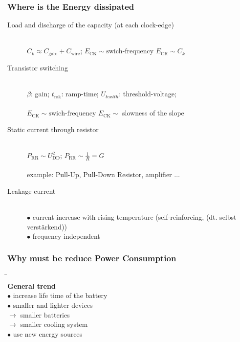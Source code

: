 \subsubsection{Where is the Energy dissipated}
\begin{description}
	\item[Load and discharge of the capacity (at each clock-edge)] \hfill \\
		   \quad $C_k \approx C_{\text{gate}} + C_{\text{wire}}$; \quad $E_{\text{CK}} \sim \text{swich-frequency}$ \quad $E_{\text{CR}} \sim C_k$
		
	\item[Transistor switching ] \hfill \\
		   \quad $\beta$: gain; \quad $t_{\text{rak}}$: ramp-time;  \quad $U_{text{th}}$: threshold-voltage; \\\\ \quad $E_{\text{CK}} \sim \text{swich-frequency}$ \quad $E_{\text{CK}} \sim$ slowness of the slope

	\item[Static current through resistor] \hfill \\
		   \quad $P_{\text{RR}} \sim U_{\text{DD}}^2$; \quad $P_{\text{RR}} \sim \frac{1}{R} = G$\\\\
		example: Pull-Up, Pull-Down Resistor, amplifier $\ldots$
		
	\item[Leakage current] \hfill \\
		$\bullet$ current increase with rising temperature (self-reinforcing, (dt. selbst verstärkend)) \\
		$\bullet$ frequency independent
\end{description}

\subsubsection{Why must be reduce Power Consumption}
\begin{tabbing}
	\hspace{10mm} \= \hspace{5mm} \= \\
	\textbf{General trend}	 \hfill \\
						\>$\bullet$ \>increase life time of the battery \\
						\>$\bullet$ \>smaller and lighter devices \\
							     \> \>$\rightarrow$ smaller batteries \\
							     \> \>$\rightarrow$ smaller cooling system \\
						\>$\bullet$ \>use new energy sources 
\end{tabbing}

